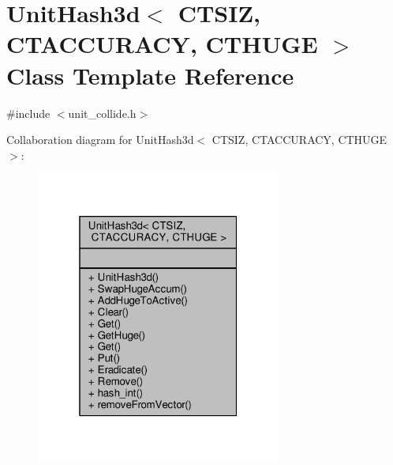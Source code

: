 \hypertarget{classUnitHash3d}{}\section{Unit\+Hash3d$<$ C\+T\+S\+IZ, C\+T\+A\+C\+C\+U\+R\+A\+CY, C\+T\+H\+U\+GE $>$ Class Template Reference}
\label{classUnitHash3d}


{\ttfamily \#include $<$unit\+\_\+collide.\+h$>$}



Collaboration diagram for Unit\+Hash3d$<$ C\+T\+S\+IZ, C\+T\+A\+C\+C\+U\+R\+A\+CY, C\+T\+H\+U\+GE $>$\+:
\nopagebreak
\begin{figure}[H]
\begin{center}
\leavevmode
\includegraphics[width=229pt]{d7/d9d/classUnitHash3d__coll__graph}
\end{center}
\end{figure}
